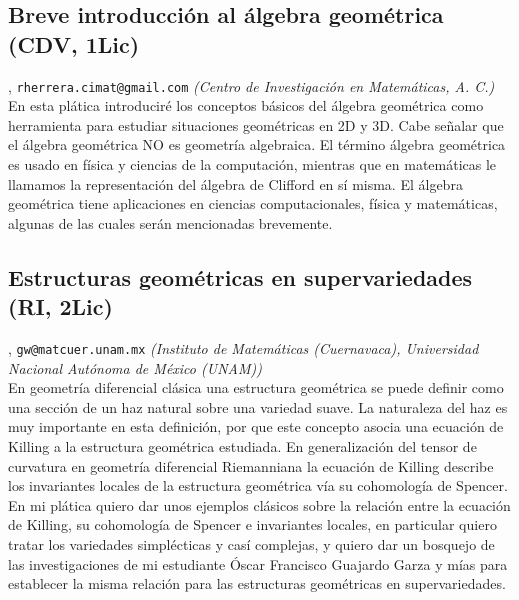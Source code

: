 \subsection{\sffamily Breve introducci\'on al \'algebra geom\'etrica {\footnotesize (CDV, 1Lic)}} \label{reg-379} 
, {\tt rherrera.cimat@gmail.com}  {\slshape (Centro de Investigaci\'on en Matem\'aticas, A. C.)}\\
          \noindent En esta pl\'atica introducir\'e los conceptos b\'asicos del \'algebra geom\'etrica como herramienta para estudiar situaciones geom\'etricas en 2D y 3D. Cabe se\~nalar que el \'algebra geom\'etrica NO es geometr\'ia algebraica. El t\'ermino \'algebra geom\'etrica es usado en f\'isica y ciencias de la computaci\'on, mientras que en matem\'aticas le llamamos la representaci\'on del \'algebra de Clifford en s\'i misma. El \'algebra geom\'etrica tiene aplicaciones en ciencias computacionales, f\'isica y matem\'aticas, algunas de las cuales ser\'an mencionadas brevemente.
\subsection{\sffamily Estructuras geom\'etricas en supervariedades {\footnotesize (RI, 2Lic)}} \label{reg-840} 
, {\tt gw@matcuer.unam.mx}  {\slshape (Instituto de Matem\'aticas (Cuernavaca), Universidad Nacional Aut\'onoma de M\'exico (UNAM))}\\
          \noindent En geometr\'ia diferencial cl\'asica una estructura geom\'etrica se puede definir como una secci\'on de un haz natural sobre una variedad suave. La naturaleza del haz es muy importante en esta definici\'on, por que este concepto asocia una ecuaci\'on de Killing a la estructura geom\'etrica estudiada. En generalizaci\'on del tensor de curvatura en geometr\'ia diferencial Riemanniana la ecuaci\'on de Killing describe los invariantes locales de la estructura geom\'etrica v\'ia su cohomolog\'ia de Spencer. En mi pl\'atica quiero dar unos ejemplos cl\'asicos sobre la relaci\'on entre la ecuaci\'on de Killing, su cohomolog\'ia de Spencer e invariantes locales, en particular quiero tratar los variedades simpl\'ecticas y cas\'i complejas, y quiero dar un bosquejo de las investigaciones de mi estudiante \'Oscar Francisco Guajardo Garza y m\'ias para establecer la misma relaci\'on para las estructuras geom\'etricas en supervariedades.
